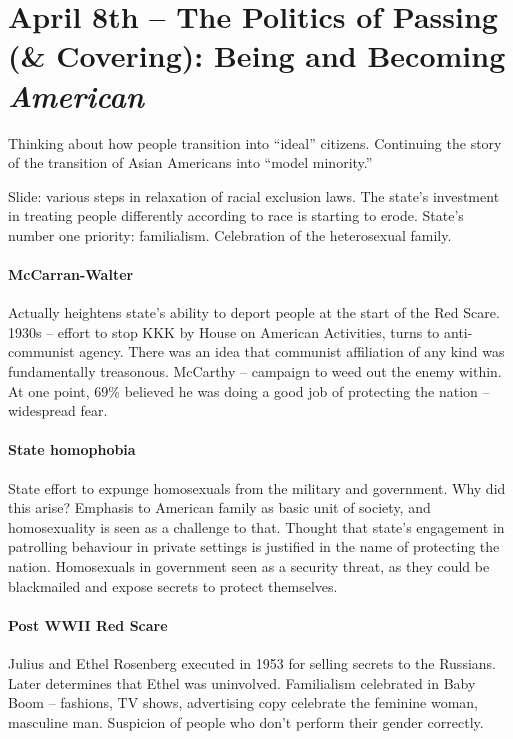 \section{April 8th -- The Politics of Passing (\& Covering): Being and Becoming \textit{American}}

Thinking about how people transition into ``ideal'' citizens. Continuing the story of the transition of Asian Americans into ``model minority.''

Slide: various steps in relaxation of racial exclusion laws. The state's investment in treating people differently according to race is starting to erode. State's number one priority: familialism. Celebration of the heterosexual family. 

\paragraph{McCarran-Walter} Actually heightens state's ability to deport people at the start of the Red Scare. 1930s -- effort to stop KKK by House on American Activities, turns to anti-communist agency. There was an idea that communist affiliation of any kind was fundamentally treasonous. McCarthy -- campaign to weed out the enemy within. At one point, 69\% believed he was doing a good job of protecting the nation -- widespread fear.


\paragraph{State homophobia} State effort to expunge homosexuals from the military and government. Why did this arise? Emphasis to American family as basic unit of society, and homosexuality is seen as a challenge to that. Thought that state's engagement in patrolling behaviour in private settings is justified in the name of protecting the nation. Homosexuals in government seen as a security threat, as they could be blackmailed and expose secrets to protect themselves.

\paragraph{Post WWII Red Scare} Julius and Ethel Rosenberg executed in 1953 for selling secrets to the Russians. Later determines that Ethel was uninvolved. Familialism celebrated in Baby Boom -- fashions, TV shows, advertising copy celebrate the feminine woman, masculine man. Suspicion of people who don't perform their gender correctly.

